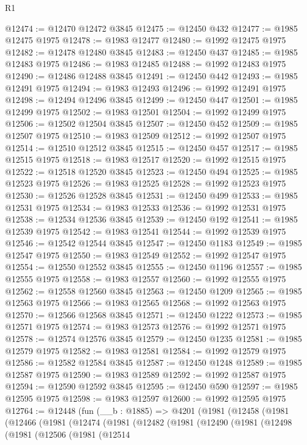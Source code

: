 \begin{lexlean}{R1}
\begin{coremodule}
@12474 := @12470 @12472 @3845
@12475 := @12450 @432
@12477 := @1985 @12475 @1975
@12478 := @1983 @12477
@12480 := @1992 @12475 @1975
@12482 := @12478 @12480 @3845
@12483 := @12450 @437
@12485 := @1985 @12483 @1975
@12486 := @1983 @12485
@12488 := @1992 @12483 @1975
@12490 := @12486 @12488 @3845
@12491 := @12450 @442
@12493 := @1985 @12491 @1975
@12494 := @1983 @12493
@12496 := @1992 @12491 @1975
@12498 := @12494 @12496 @3845
@12499 := @12450 @447
@12501 := @1985 @12499 @1975
@12502 := @1983 @12501
@12504 := @1992 @12499 @1975
@12506 := @12502 @12504 @3845
@12507 := @12450 @452
@12509 := @1985 @12507 @1975
@12510 := @1983 @12509
@12512 := @1992 @12507 @1975
@12514 := @12510 @12512 @3845
@12515 := @12450 @457
@12517 := @1985 @12515 @1975
@12518 := @1983 @12517
@12520 := @1992 @12515 @1975
@12522 := @12518 @12520 @3845
@12523 := @12450 @494
@12525 := @1985 @12523 @1975
@12526 := @1983 @12525
@12528 := @1992 @12523 @1975
@12530 := @12526 @12528 @3845
@12531 := @12450 @499
@12533 := @1985 @12531 @1975
@12534 := @1983 @12533
@12536 := @1992 @12531 @1975
@12538 := @12534 @12536 @3845
@12539 := @12450 @192
@12541 := @1985 @12539 @1975
@12542 := @1983 @12541
@12544 := @1992 @12539 @1975
@12546 := @12542 @12544 @3845
@12547 := @12450 @1183
@12549 := @1985 @12547 @1975
@12550 := @1983 @12549
@12552 := @1992 @12547 @1975
@12554 := @12550 @12552 @3845
@12555 := @12450 @1196
@12557 := @1985 @12555 @1975
@12558 := @1983 @12557
@12560 := @1992 @12555 @1975
@12562 := @12558 @12560 @3845
@12563 := @12450 @1209
@12565 := @1985 @12563 @1975
@12566 := @1983 @12565
@12568 := @1992 @12563 @1975
@12570 := @12566 @12568 @3845
@12571 := @12450 @1222
@12573 := @1985 @12571 @1975
@12574 := @1983 @12573
@12576 := @1992 @12571 @1975
@12578 := @12574 @12576 @3845
@12579 := @12450 @1235
@12581 := @1985 @12579 @1975
@12582 := @1983 @12581
@12584 := @1992 @12579 @1975
@12586 := @12582 @12584 @3845
@12587 := @12450 @1248
@12589 := @1985 @12587 @1975
@12590 := @1983 @12589
@12592 := @1992 @12587 @1975
@12594 := @12590 @12592 @3845
@12595 := @12450 @590
@12597 := @1985 @12595 @1975
@12598 := @1983 @12597
@12600 := @1992 @12595 @1975
@12764 := @12448
    (fun (__b : @1885) =>
    @4201
      (@1981
        (@12458
          (@1981
            (@12466
              (@1981
                (@12474
                  (@1981
                    (@12482
                      (@1981
                        (@12490
                          (@1981
                            (@12498
                              (@1981
                                (@12506
                                  (@1981
                                    (@12514

\end{coremodule}
\end{lexlean}
